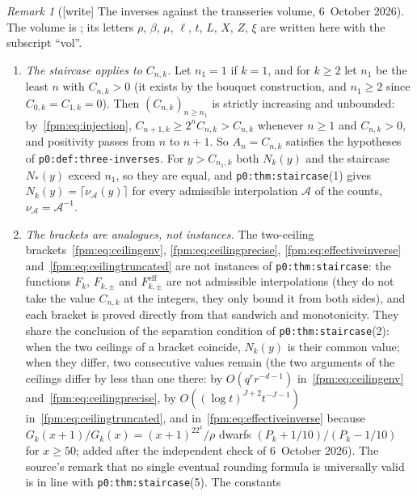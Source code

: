 \documentclass[11pt]{article}
\theoremstyle{definition}\newtheorem{definition}[theorem]{Definition}
\theoremstyle{remark}\newtheorem{remark}[theorem]{Remark}
\newcommand{\file}[1]{\nolinkurl{#1}}
\begin{document}
\begin{remark}[{[write]} The inverses against the transseries volume, 6~October 2026]\label{fpm:rem:transseries}
The volume is
;
its letters $\rho$, $\beta$, $\mu$, $\ell$, $t$, $L$, $X$, $Z$, $\xi$ are
written here with the subscript ``vol''.
\begin{enumerate}[label=(\alph*)]
\item \emph{The staircase applies to $C_{n,k}$.} Let $n_1=1$ if $k=1$, and
 for $k\ge2$ let $n_1$ be the least $n$ with $C_{n,k}>0$ (it exists by the
 bouquet construction, and $n_1\ge2$ since $C_{0,k}=C_{1,k}=0$). Then
 $(C_{n,k})_{n\ge n_1}$ is strictly increasing and unbounded:
 by~\eqref{fpm:eq:injection}, $C_{n+1,k}\ge2^nC_{n,k}>C_{n,k}$ whenever
 $n\ge1$ and $C_{n,k}>0$, and positivity passes from $n$ to $n+1$. So
 $A_n=C_{n,k}$ satisfies the hypotheses of \file{p0:def:three-inverses}.
 For $y>C_{n_1,k}$ both $N_k(y)$ and the staircase $N_\ast(y)$ exceed
 $n_1$, so they are equal, and \file{p0:thm:staircase}(1) gives
 $N_k(y)=\lceil\nu_{\mathcal A}(y)\rceil$ for every admissible interpolation
 $\mathcal A$ of the counts, $\nu_{\mathcal A}=\mathcal A^{-1}$.
\item \emph{The brackets are analogues, not instances.} The two-ceiling
 brackets~\eqref{fpm:eq:ceilingenv}, \eqref{fpm:eq:ceilingprecise},
 \eqref{fpm:eq:effectiveinverse} and~\eqref{fpm:eq:ceilingtruncated} are not
 instances of \file{p0:thm:staircase}: the functions $F_k$, $F_{k,\pm}$ and
 $F^{\mathrm{eff}}_{k,\pm}$ are not admissible interpolations (they do not take
 the value $C_{n,k}$ at the integers, they only bound it from both sides),
 and each bracket is proved directly from that sandwich and monotonicity. They
 share the conclusion of the separation condition of
 \file{p0:thm:staircase}(2): when the two ceilings of a bracket coincide,
 $N_k(y)$ is their common value; when they differ, two consecutive values
 remain (the two arguments of the ceilings differ by less than one there:
 by $O(q^rr^{-d-1})$ in~\eqref{fpm:eq:ceilingenv}
 and~\eqref{fpm:eq:ceilingprecise}, by
 $O((\log t)^{J+2}t^{-J-1})$ in~\eqref{fpm:eq:ceilingtruncated}, and
 in~\eqref{fpm:eq:effectiveinverse} because $G_k(x+1)/G_k(x)=(x+1)^22^x/\rho$
 dwarfs $(P_k+1/10)/(P_k-1/10)$ for $x\ge50$; \textup{added after the
 independent check of 6~October 2026}). The source's remark that no single eventual rounding formula is
 universally valid is in line with \file{p0:thm:staircase}(5). The constants

\end{enumerate}
\end{remark}
\end{document}
